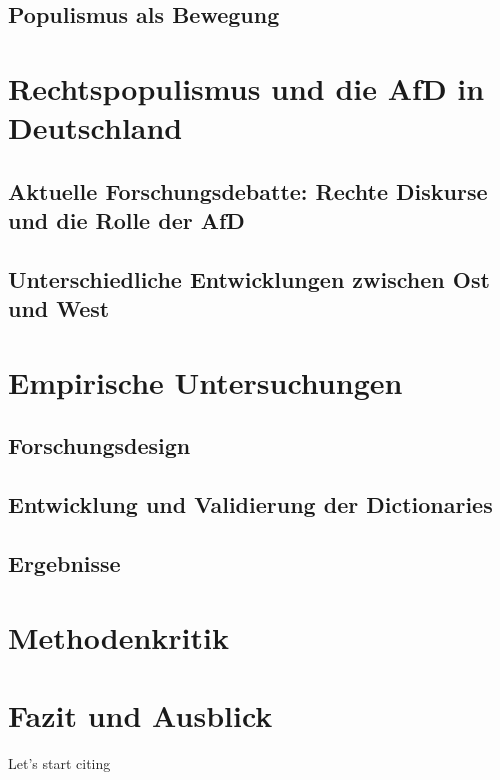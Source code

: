 \documentclass[a4paper]{scrreprt}
\begin{document}
\section{Populismus als Bewegung}
\chapter{Rechtspopulismus und die AfD in Deutschland}
\section{Aktuelle Forschungsdebatte: Rechte Diskurse und die Rolle der AfD}
\section{Unterschiedliche Entwicklungen zwischen Ost und West}
\chapter{Empirische Untersuchungen}
\section{Forschungsdesign}
\section{Entwicklung und Validierung der Dictionaries}
\section{Ergebnisse}
\chapter{Methodenkritik}
\chapter{Fazit und Ausblick}
Let's start citing \citep[p.~22]{canovan:2002}


\end{document}
